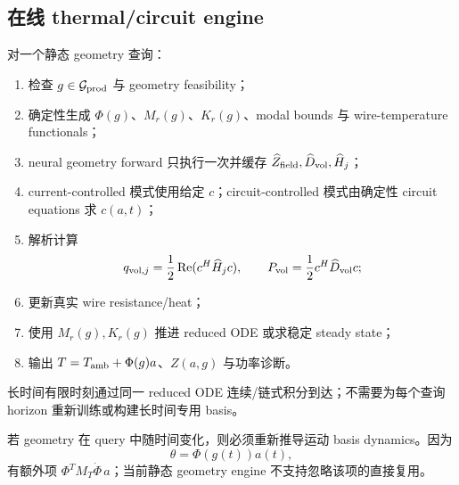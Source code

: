 \subsection{在线 thermal/circuit engine}
对一个静态 geometry 查询：
\begin{enumerate}
  \item 检查 $g\in\mathcal G_{\rm prod}$ 与 geometry feasibility；
  \item 确定性生成 $\Phi(g)$、$M_r(g)$、$K_r(g)$、modal bounds 与 wire-temperature functionals；
  \item neural geometry forward 只执行一次并缓存 $\widehat Z_{\rm field},\widehat D_{\rm vol},\widehat H_j$；
  \item current-controlled 模式使用给定 $c$；circuit-controlled 模式由确定性 circuit equations 求 $c(a,t)$；
  \item 解析计算
  \begin{equation}
  q_{{\rm vol},j}=\frac12\operatorname{Re}(c^H\widehat H_jc),
  \qquad
  P_{\rm vol}=\frac12c^H\widehat D_{\rm vol}c;
  \end{equation}
  \item 更新真实 wire resistance/heat；
  \item 使用 $M_r(g),K_r(g)$ 推进 reduced ODE 或求稳定 steady state；
  \item 输出 $T=T_{\rm amb}+\Phi(g)a$、$Z(a,g)$ 与功率诊断。
\end{enumerate}

长时间有限时刻通过同一 reduced ODE 连续/链式积分到达；不需要为每个查询 horizon 重新训练或构建长时间专用 basis。

若 geometry 在 query 中随时间变化，则必须重新推导运动 basis dynamics。因为
\begin{equation}
\theta=\Phi(g(t))a(t),
\end{equation}
有额外项 $\Phi^TM_T\dot\Phi\,a$；当前静态 geometry engine 不支持忽略该项的直接复用。

